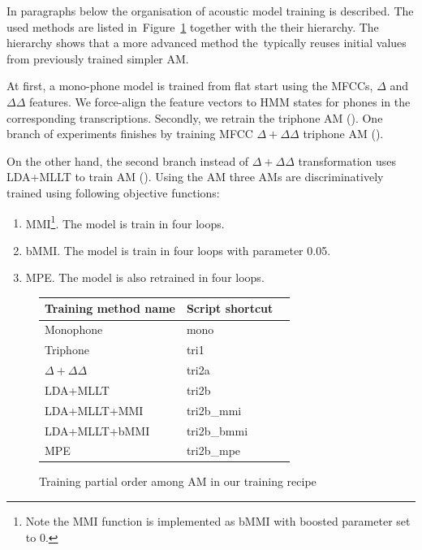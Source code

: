 In paragraphs below the organisation of acoustic model training is described. 
The used methods are listed in~Figure~\ref{fig:am-deps} together with the their hierarchy.
The hierarchy shows that a more advanced method the~typically reuses initial values from previously trained simpler \ac{AM}.

At first, a mono-phone model is trained from flat start using the MFCCs, $\Delta$ and $\Delta \Delta$ features.
We force-align the feature vectors to HMM states for phones in the corresponding transcriptions.
Secondly, we retrain the triphone \ac{AM} ().
One branch of experiments finishes by training \ac{MFCC} $\Delta + \Delta\Delta$ triphone \ac{AM} (). %

On the other hand, the second branch instead of $\Delta + \Delta\Delta$ transformation uses \ac{LDA}+\ac{MLLT} to train \ac{AM} ().
Using the \ac{AM}  three \acp{AM} are discriminatively trained using following objective functions:
\begin{enumerate}
    \item \acl{MMI}\cite{chow1990maximum}\footnote{Note the \ac{MMI} function is implemented as \acs{bMMI} with boosted parameter set to 0.}. The model is train in four loops.
    \item \acl{bMMI}\cite{povey2008boosted}. The model  is train in four loops with parameter 0.05.
    \item \acl{MPE}\cite{povey2003mmi}. The model  is also retrained in four loops.
\end{enumerate}

\begin{figure}[!htp]
    \begin{center}
    
    \small{\begin{tabular}{lll}
    \hline
    Training method name & Script shortcut \\
    \hline
    Monophone & mono \\
    Triphone  & tri1 \\
    $\Delta + \Delta\Delta$ & tri2a  \\
    \acs{LDA}+\acs{MLLT} & tri2b  \\
    \acs{LDA}+\acs{MLLT}+\acs{MMI} & tri2b\_mmi \\
    \acs{LDA}+\acs{MLLT}+\acs{bMMI} & tri2b\_bmmi \\
    \acs{MPE} & tri2b\_mpe \\
    \hline
    \end{tabular}}
    \end{center}
    \caption{Training partial order among \ac{AM} in our training recipe}
    \label{fig:am-deps} 
\end{figure}

